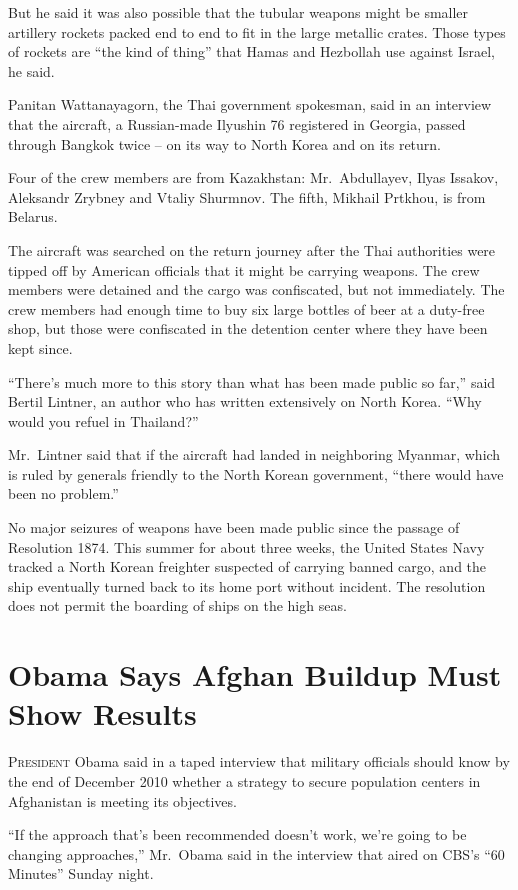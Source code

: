 ﻿\documentclass[12pt]{article}
\begin{document}
But he said it was also possible that the tubular weapons might be smaller artillery rockets packed
end to end to fit in the large metallic crates. Those types of rockets are ``the kind of thing''
that Hamas and Hezbollah use against Israel, he said.

Panitan Wattanayagorn, the Thai government spokesman, said in an interview that the aircraft, a
Russian-made Ilyushin 76 registered in Georgia, passed through Bangkok twice -- on its way to North
Korea and on its return.

Four of the crew members are from Kazakhstan: Mr.~Abdullayev, Ilyas Issakov, Aleksandr Zrybney and
Vtaliy Shurmnov. The fifth, Mikhail Prtkhou, is from Belarus.

The aircraft was searched on the return journey after the Thai authorities were tipped off by
American officials that it might be carrying weapons. The crew members were detained and the cargo
was confiscated\cite{confiscate}, but not immediately. The crew members had enough time to buy six
large bottles of beer at a duty-free shop, but those were confiscated in the detention center where
they have been kept since.

``There's much more to this story than what has been made public so far,'' said Bertil Lintner, an
author who has written extensively on North Korea. ``Why would you refuel in Thailand?''

Mr.~Lintner said that if the aircraft had landed in neighboring Myanmar, which is ruled by generals
friendly to the North Korean government, ``there would have been no problem.''

No major seizures of weapons have been made public since the passage of Resolution 1874. This summer
for about three weeks, the United States Navy tracked a North Korean freighter suspected of carrying
banned cargo, and the ship eventually turned back to its home port without incident. The resolution
does not permit the boarding of ships on the high seas.

\section{Obama Says Afghan Buildup Must Show Results}

\lettrine{P}{resident} Obama said in a taped interview that military
officials should know by the end of December 2010 whether a strategy to secure population centers in
Afghanistan is meeting its objectives.

``If the approach that's been recommended doesn't work, we're going to be changing approaches,''
Mr.~Obama said in the interview that aired on CBS's ``60 Minutes'' Sunday night.
\end{document}
